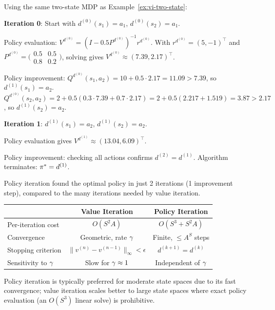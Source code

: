 \documentclass[11pt,a4paper]{article}
\begin{document}
\begin{example}
\label{ex:pi-two-state}
Using the same two-state MDP as Example~\ref{ex:vi-two-state}:

\textbf{Iteration 0}: Start with $d^{(0)}(s_1) = a_1$,
$d^{(0)}(s_2) = a_1$.

Policy evaluation: $V^{d^{(0)}} = (I - 0.5 P^{d^{(0)}})^{-1}
r^{d^{(0)}}$. With $r^{d^{(0)}} = (5, -1)^\top$ and
$P^{d^{(0)}} = \bigl(\begin{smallmatrix} 0.5 & 0.5 \\
0.8 & 0.2 \end{smallmatrix}\bigr)$, solving gives
$V^{d^{(0)}} \approx (7.39, 2.17)^\top$.

Policy improvement:
$Q^{d^{(0)}}(s_1, a_2) = 10 + 0.5 \cdot 2.17 = 11.09 > 7.39$,
so $d^{(1)}(s_1) = a_2$.
$Q^{d^{(0)}}(s_2, a_2) = 2 + 0.5(0.3 \cdot 7.39 + 0.7 \cdot 2.17)
= 2 + 0.5(2.217 + 1.519) = 3.87 > 2.17$,
so $d^{(1)}(s_2) = a_2$.

\textbf{Iteration 1}: $d^{(1)}(s_1) = a_2$, $d^{(1)}(s_2) = a_2$.

Policy evaluation gives $V^{d^{(1)}} \approx (13.04, 6.09)^\top$.

Policy improvement: checking all actions confirms $d^{(2)} = d^{(1)}$.
Algorithm terminates: $\pi^* = d^{(1)}$.

Policy iteration found the optimal policy in just 2 iterations (1
improvement step), compared to the many iterations needed by value
iteration.
\end{example}

\begin{keyresult}[title={Value Iteration vs.\ Policy Iteration}]
\begin{center}
\begin{tabular}{lcc}
\toprule
& \textbf{Value Iteration} & \textbf{Policy Iteration} \\
\midrule
Per-iteration cost & $O(S^2 A)$ & $O(S^3 + S^2 A)$ \\
Convergence & Geometric, rate $\gamma$ & Finite, $\leq A^S$ steps \\
Stopping criterion & $\|v^{(n)}-v^{(n-1)}\|_\infty < \epsilon$ &
$d^{(k+1)} = d^{(k)}$ \\
Sensitivity to $\gamma$ & Slow for $\gamma \approx 1$ &
Independent of $\gamma$ \\
\bottomrule
\end{tabular}
\end{center}
Policy iteration is typically preferred for moderate state spaces due
to its fast convergence; value iteration scales better to large state
spaces where exact policy evaluation (an $O(S^3)$ linear solve) is
prohibitive.
\end{keyresult}
\end{document}
